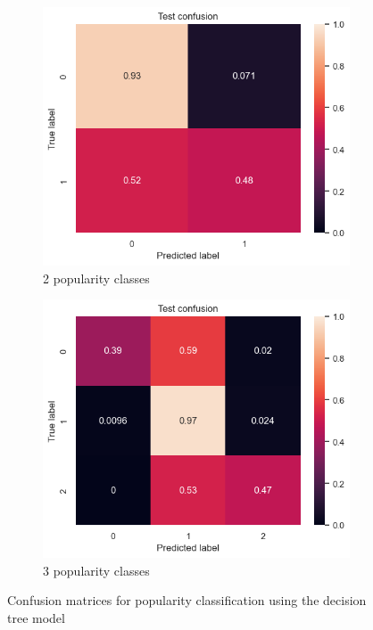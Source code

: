 \documentclass{article}
\begin{document}
\begin{figure}[htbp]
    \centering
    \begin{subfigure}[b]{0.38\textwidth}
        \centering
        \includegraphics[width=\textwidth]{Figures/2classes_confusion.png}
        \caption{2 popularity classes}
        \label{fig:left}
    \end{subfigure}
    \hfill
    \begin{subfigure}[b]{0.38\textwidth}
        \centering
        \includegraphics[width=\textwidth]{Figures/3classes_confusion.png}
        \caption{3 popularity classes}
        \label{fig:right}
    \end{subfigure}
    \caption{Confusion matrices for popularity classification using the decision tree model}
    \label{fig:lea_confusion}
\end{figure}
\end{document}
